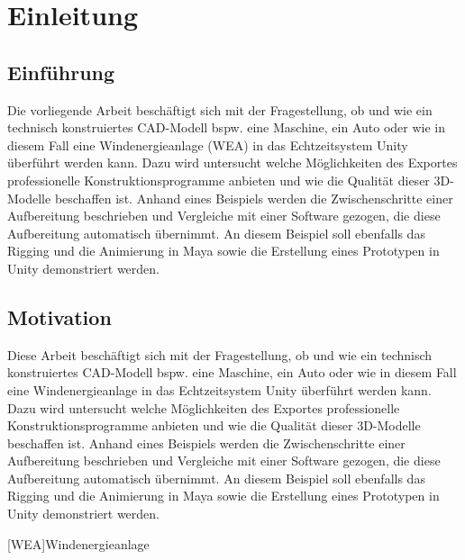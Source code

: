\chapter{Einleitung}
\section{Einführung}

Die vorliegende Arbeit beschäftigt sich mit der Fragestellung, ob und wie ein technisch konstruiertes CAD-Modell bspw. eine Maschine, ein Auto oder wie in diesem Fall eine Windenergieanlage (WEA) in das Echtzeitsystem Unity überführt werden kann. Dazu wird untersucht welche Möglichkeiten des Exportes professionelle Konstruktionsprogramme anbieten und wie die Qualität dieser 3D-Modelle beschaffen ist. Anhand eines Beispiels werden die Zwischenschritte einer Aufbereitung beschrieben und Vergleiche mit einer Software gezogen, die diese Aufbereitung automatisch übernimmt. An diesem Beispiel soll ebenfalls das Rigging und die Animierung in Maya sowie die Erstellung eines Prototypen in Unity demonstriert werden. 

\newpage
\section{Motivation}

Diese Arbeit beschäftigt sich mit der Fragestellung, ob und wie ein technisch konstruiertes CAD-Modell bspw. eine Maschine, ein Auto oder wie in diesem Fall eine Windenergieanlage in das Echtzeitsystem Unity überführt werden kann. Dazu wird untersucht welche Möglichkeiten des Exportes professionelle Konstruktionsprogramme anbieten und wie die Qualität dieser 3D-Modelle beschaffen ist. Anhand eines Beispiels werden die Zwischenschritte einer Aufbereitung beschrieben und Vergleiche mit einer Software gezogen, die diese Aufbereitung automatisch übernimmt. An diesem Beispiel soll ebenfalls das Rigging und die Animierung in Maya sowie die Erstellung eines Prototypen in Unity demonstriert werden. 

\begin{acronym}
[WEA]{Windenergieanlage}
\end{acronym}

\newpage
